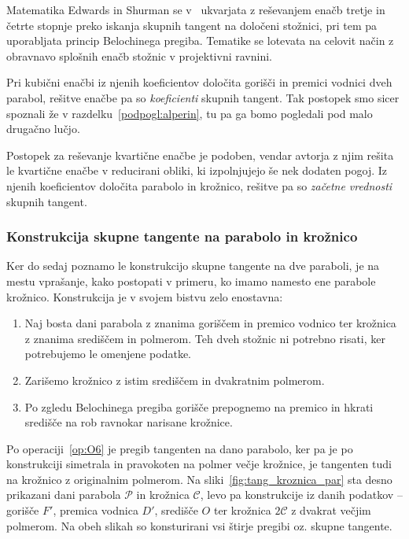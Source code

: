 Matematika Edwards in Shurman se v~\cite{edwards2001} ukvarjata z reševanjem enačb tretje in četrte stopnje preko iskanja skupnih tangent na določeni stožnici, pri tem pa uporabljata princip Belochinega pregiba. Tematike se lotevata na celovit način z obravnavo splošnih enačb stožnic v projektivni ravnini.

Pri kubični enačbi iz njenih koeficientov določita gorišči in premici vodnici dveh parabol, rešitve enačbe pa so \emph{koeficienti} skupnih tangent. Tak postopek smo sicer spoznali že v razdelku~\ref{podpogl:alperin}, tu pa ga bomo pogledali pod malo drugačno lučjo.

Postopek za reševanje kvartične enačbe je podoben, vendar avtorja z njim rešita le kvartične enačbe v reducirani obliki, ki izpolnjujejo še nek dodaten pogoj. Iz njenih koeficientov določita parabolo in krožnico, rešitve pa so \emph{začetne vrednosti} skupnih tangent.

\subsubsection*{Konstrukcija skupne tangente na parabolo in krožnico}

Ker do sedaj poznamo le konstrukcijo skupne tangente na dve paraboli, je na mestu vprašanje, kako postopati v primeru, ko imamo namesto ene parabole krožnico. Konstrukcija je v svojem bistvu zelo enostavna:
\begin{enumerate}
    \item Naj bosta dani parabola z znanima goriščem in premico vodnico ter krožnica z znanima središčem in polmerom. Teh dveh stožnic ni potrebno risati, ker potrebujemo le omenjene podatke.
    \item Zarišemo krožnico z istim središčem in dvakratnim polmerom.
    \item Po zgledu Belochinega pregiba gorišče prepognemo na premico in hkrati središče na rob ravnokar narisane krožnice.
\end{enumerate}

Po operaciji~\ref{op:O6} je pregib tangenten na dano parabolo, ker pa je po konstrukciji simetrala in pravokoten na polmer večje krožnice, je tangenten tudi na krožnico z originalnim polmerom. Na sliki~\ref{fig:tang_kroznica_par} sta desno prikazani dani parabola $\mathcal{P}$ in krožnica $\mathcal{C}$, levo pa konstrukcije iz danih podatkov -- gorišče $F'$, premica vodnica $D'$, središče $O$ ter krožnica $2\mathcal{C}$ z dvakrat večjim polmerom. Na obeh slikah so konsturirani vsi štirje pregibi oz. skupne tangente.

